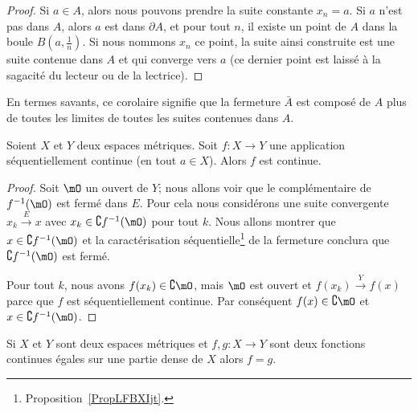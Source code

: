 \begin{proof}
  Si $a\in A$, alors nous pouvons prendre la suite constante $x_n=a$. Si $a$ n'est pas dans $A$, alors $a$ est dans $\partial A$, et pour tout $n$, il existe un point de $A$ dans la boule $B(a,\frac{1}{ n })$. Si nous nommons $x_n$ ce point, la suite ainsi construite est une suite contenue dans $A$ et qui converge vers $a$ (ce dernier point est laissé à la sagacité du lecteur ou de la lectrice).
\end{proof}

En termes savants, ce corolaire signifie que la fermeture $\bar A$ est composé de $A$ plus de toutes les limites de toutes les suites contenues dans $A$.

\begin{proposition}     \label{PropXIAQSXr}
    Soient \( X\) et \( Y\) deux espaces métriques. Soit \( f\colon X\to Y\) une application séquentiellement continue (en tout \( a \in X \)). Alors \( f\) est continue.
\end{proposition}

\begin{proof}
    Soit \( \mO\) un ouvert de \( Y\); nous allons voir que le complémentaire de \( f^{-1}(\mO)\) est fermé dans \( E\). Pour cela nous considérons une suite convergente \( x_k\stackrel{E}{\longrightarrow} x\) avec \( x_k\in\complement f^{-1}(\mO)\) pour tout \( k\). Nous allons montrer que \( x\in \complement f^{-1}(\mO)\) et la caractérisation séquentielle\footnote{Proposition~\ref{PropLFBXIjt}.} de la fermeture conclura que \( \complement f^{-1}(\mO)\) est fermé.

    Pour tout \( k\), nous avons \( f(x_k)\in\complement \mO\), mais \( \mO\) est ouvert et \( f(x_k)\stackrel{Y}{\longrightarrow}f(x)\) parce que \( f\) est séquentiellement continue. Par conséquent \( f(x)\in\complement \mO\) et \( x\in\complement f^{-1}(\mO)\).
\end{proof}


\begin{proposition} \label{PropCJGIooZNpnGF}
    Si \( X\) et \( Y\) sont deux espaces métriques et \( f,g\colon X\to Y\) sont deux fonctions continues égales sur une partie dense de \( X\) alors \( f=g\).
\end{proposition}

